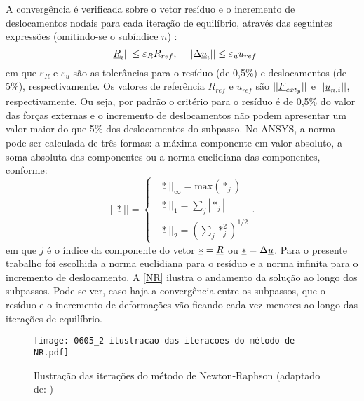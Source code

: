 A convergência é verificada sobre o vetor resíduo e o incremento de deslocamentos nodais para cada iteração de equilíbrio, através das seguintes expressões (omitindo-se o subíndice $n$) \cite[p. 667]{ANSYS2018}:
\begin{equation}
	\label{eq:convergencia}
	||\underline{R}_i|| \leq \varepsilon_R R_{ref},~~~ ||\Delta \underline u_i || \leq \varepsilon_u u_{ref}
\end{equation}
em que $\varepsilon_R$ e $\varepsilon_u$ são as tolerâncias para o resíduo (de 0,5\%) e deslocamentos (de 5\%), respectivamente. Os valores de referência $R_{ref}$ e $u_{ref}$ são $||\underline{F}_{ext_p}||$ e $||\underline u_{n,i}||$, respectivamente. Ou seja, por padrão o critério para o resíduo é de 0,5\% do valor das forças externas e o incremento de deslocamentos não podem apresentar um valor maior do que 5\% dos deslocamentos do subpasso. No ANSYS, a norma pode ser calculada de três formas: a máxima componente em valor absoluto, a soma absoluta das componentes ou a norma euclidiana das componentes, conforme:
\begin{equation}
	\label{eq:jacobiano_transformacao}
	||\underline *|| = \left\{
	\begin{array}{lcl}
		||\underline *||_\infty = \text{max}(*_j) \\
		||\underline *||_1 = \sum_{j}|*_j| \\
		||\underline *||_2 = (\sum_{j}*_j^2)^{1/2}
	\end{array}
	\right..
\end{equation}
em que $j$ é o índice da componente do vetor $\underline * = \underline{R}$ ou $\underline * = \Delta \underline u$. Para o presente trabalho foi escolhida a norma euclidiana para o resíduo e a norma infinita para o incremento de deslocamento. A \autoref{NR} ilustra o andamento da solução ao longo dos subpassos. Pode-se ver, caso haja a convergência entre os subpassos, que o resíduo e o incremento de deformações vão ficando cada vez menores ao longo das iterações de equilíbrio.
\begin{figure}[H]
	\begin{center}
		\texttt{[image: 0605\_2-ilustracao das iteracoes do método de NR.pdf]}
	\end{center}
	\caption{\label{NR}Ilustração das iterações do método de Newton-Raphson (adaptado de: )}
\end{figure}

